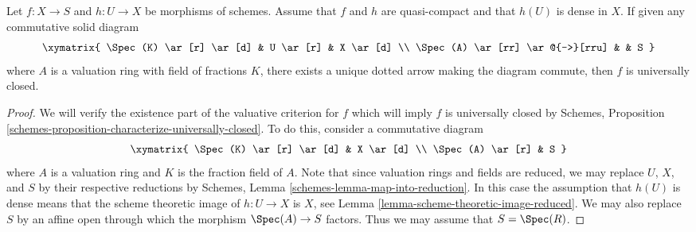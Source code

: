 \begin{lemma}
\label{lemma-refined-valuative-criterion-universally-closed}
Let $f : X \to S$ and $h : U \to X$ be morphisms of schemes.
Assume that $f$ and $h$ are quasi-compact and that $h(U)$ is dense in $X$.
If given any commutative solid diagram
$$
\xymatrix{
\Spec(K) \ar[r] \ar[d] & U \ar[r] & X \ar[d] \\
\Spec(A) \ar[rr] \ar@{-->}[rru] & & S
}
$$
where $A$ is a valuation ring with field of fractions $K$, there
exists a unique dotted arrow making the diagram commute, then $f$
is universally closed.
\end{lemma}

\begin{proof}
We will verify the existence part of the valuative criterion for $f$
which will imply $f$ is universally closed by
Schemes, Proposition \ref{schemes-proposition-characterize-universally-closed}.
To do this, consider a commutative diagram
$$
\xymatrix{
\Spec(K) \ar[r] \ar[d] & X \ar[d] \\
\Spec(A) \ar[r] & S
}
$$
where $A$ is a valuation ring and $K$ is the fraction field of $A$.
Note that since valuation rings and fields are reduced, we may
replace $U$, $X$, and $S$ by their respective reductions
by Schemes, Lemma \ref{schemes-lemma-map-into-reduction}.
In this case the assumption that $h(U)$ is dense means that
the scheme theoretic image of $h : U \to X$ is $X$, see
Lemma \ref{lemma-scheme-theoretic-image-reduced}.
We may also replace $S$ by an affine open through which
the morphism $\Spec(A) \to S$ factors. Thus we may
assume that $S = \Spec(R)$.


\end{proof}
